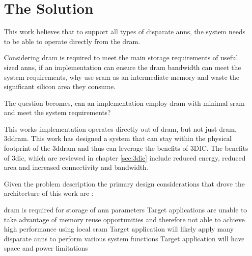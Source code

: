 
\section[The Solution]{The Solution}
\label{sec:The Solution}

This work believes that to support all types of disparate \ac{ann}s, the system needs to be able to operate directly from the \ac{dram}.
\iffalse 
This is because SRAM-based solutions assume memory reuse when processing a \ac{ann}.
However, when \ac{ann}s do not provide sufficient reuse these solutions become \ac{dram} bandwidth bound. 
\fi

Considering \ac{dram} is required to meet the main storage requirements of useful sized \ac{ann}s, if an implementation can ensure the \ac{dram} bandwidth can meet the system requirements, why use \ac{sram} as an intermediate memory and waste the significant silicon area they consume.

The question becomes, can an implementation employ \ac{dram} with minimal \ac{sram} and meet the system requirements?

This works implementation operates directly out of \ac{dram}, but not just \ac{dram}, \ac{3ddram}.
This work has designed a system that can stay within the physical footprint of the \ac{3ddram} and thus can leverage the benefits of 3DIC.
The benefits of \ac{3dic}, which are reviewed in chapter \ref{sec:3dic} include reduced energy, reduced area and increased connectivity and bandwidth.

\iffalse
Therefore, this work is able to propose a custom 3D-\ac{dram} that exposes more of the \ac{dram}s internal page and thus generates interface bandwidth that is of the order of 64 times that of the standard \ac{3ddram}.
\fi

Given the problem description \iffalse outlined in section \ref{sec:The Problem},\fi the primary design considerations that drove the architecture of this work are :
\begin{outline}
  \1 \ac{dram} is required for storage of \ac{ann} parameters 
  \1 Target applications are unable to take advantage of memory reuse opportunities and therefore not able to achieve high performance using local \ac{sram} \iffalse to store \ac{ann} parameters or the \ac{ann} input \fi
  \1 Target application will likely apply many disparate \acp{ann} to perform various system functions
  \1 Target application will have space and power limitations
\end{outline}

